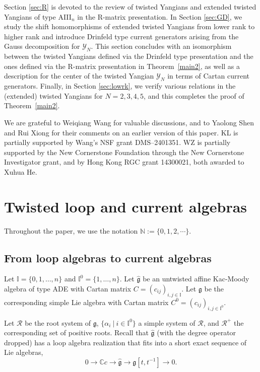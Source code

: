 \documentclass[11pt,reqno]{amsart}
\numberwithin{equation}{section}
\theoremstyle{definition}
\theoremstyle{remark}
\newcommand{\beq}{\begin{equation}}
\newcommand{\eeq}{\end{equation}}
\newcommand{\bN}{\mathbb{N}}
\newcommand{\cR}{\mathcal{R}}
\newcommand{\g}{\mathfrak{g}}
\newcommand{\wt}{\widehat}
\newcommand{\Y}{{\mathscr{Y}}}
\def \I{\mathbb{I}}
\def \C{\mathbb{C}}
\begin{document}
Section \ref{sec:R} is devoted to the review of
twisted Yangians and extended twisted Yangians of type AIII$_n$ in the R-matrix presentation. In Section \ref{sec:GD}, we study the shift homomorphisms of extended twisted Yangians from lower rank to higher rank and introduce Drinfeld type current generators arising from the Gauss decomposition for $\Y_N$. %
This section concludes with an isomorphism between the twisted Yangians defined via the Drinfeld type presentation and the ones defined via the R-matrix presentation in Theorem~\ref{main2}, as well as a description for the center of the twisted Yangian $\Y_N$ in terms of Cartan current generators. Finally,  in Section \ref{sec:lowrk}, we verify various relations in the (extended) twisted Yangians for $N=2,3,4,5$, and this completes the proof of Theorem~\ref{main2}.%

\vspace{3mm}

 We are grateful to Weiqiang Wang for valuable discussions, and to Yaolong Shen and Rui Xiong for their comments on an earlier version of this paper. KL is partially supported by Wang's NSF grant DMS--2401351. WZ is partially supported by the New Cornerstone Foundation through the
New Cornerstone Investigator grant, and by Hong Kong RGC grant 14300021, both awarded to Xuhua He.

\section{Twisted loop and current algebras}\label{sec:pre}
Throughout the paper, we use the notation $\bN:=\{0,1,2,\cdots\}$.
\subsection{From loop algebras to current algebras}
Let $\I=\{0,1,\dots,n\}$ and $\I^0=\{1,\dots,n\}$. Let $\wt{\g}$ be an untwisted affine Kac-Moody algebra of type ADE with Cartan matrix $C=(c_{ij})_{i,j\in\I}$. Let $\g$ be the corresponding simple Lie algebra with Cartan matrix $C^0=(c_{ij})_{i,j\in\I^0}$. 

Let $\cR$ be the root system of $\g$, $\{\alpha_i~|~i\in \I^0\}$ a simple system of $\cR$, and $\cR^+$ the corresponding set of positive roots. Recall that $\wt{\g}$ (with the degree operator dropped) has a loop algebra realization that fits into a short exact sequence of Lie algebras,
\beq\label{ghat}
0 \longrightarrow \C c \longrightarrow \wt{\g} \longrightarrow \mathfrak{g}[t,t^{-1}]\longrightarrow 0.
\eeq
\end{document}
